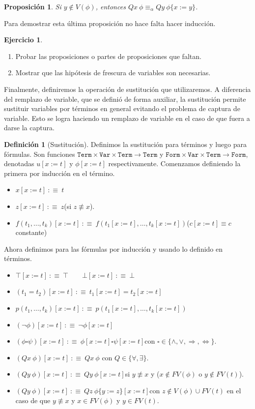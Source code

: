 \documentclass[a4paper, 12pt]{report}
\newcommand{\Ra}{\Rightarrow}
\newcommand{\Lra}{\Leftrightarrow}
\newtheorem{prop}[teorema]{Proposición}
\theoremstyle{definition}
\newtheorem{definicion}[teorema]{Definición}
\newtheorem{ejercicio}{Ejercicio}[section]
\begin{document}
\begin{prop}\label{prop-alphaEquivCV}
	Si $y\not\in V(\phi)$, entonces $Qx~\phi\equiv_\alpha Qy~\phi\{x:=y\}$.
\end{prop}
Para demostrar esta última proposición no hace falta hacer inducción.

\begin{ejercicio}
	\begin{enumerate}
		\item Probar las proposiciones o partes de proposiciones que faltan.
		\item Mostrar que las hipótesis de frescura de variables son necesarias.
	\end{enumerate}
	
\end{ejercicio}

Finalmente, definiremos la operación de sustitución que utilizaremos. A diferencia del remplazo de variable, que se definió de forma auxiliar, la sustitución permite sustituir variables por términos en general evitando el problema de captura de variable. Esto se logra haciendo un remplazo de variable en el caso de que fuera a darse la captura.

\begin{definicion}[Sustitución]
	Definimos la sustitución para términos y luego para fórmulas. Son funciones $\mathtt{Term}\times\mathtt{Var}\times\mathtt{Term}\to\mathtt{Term}$ y $\mathtt{Form}\times\mathtt{Var}\times\mathtt{Term}\to\mathtt{Form}$, denotadas $u[x:=t]$ y $\phi[x:=t]$ respectivamente. Comenzamos definiendo la primera por inducción en el término.
	\begin{itemize}
		\item $x[x:=t] ~:\equiv~ t$
		\item $z[x:=t] ~:\equiv~ z$\quad(si $z\not\equiv x$).
		\item $f(t_1,\dots,t_k)[x:=t]~:\equiv~f(t_1[x:=t],\dots,t_k[x:=t])$\quad ($c[x:=t]\equiv c$ constante)
	\end{itemize}
	Ahora definimos para las fórmulas por inducción y usando lo definido en términos.
	\begin{itemize}
		\item $\top[x:=t]~:\equiv~\top\qquad \bot[x:=t]~:\equiv~\bot$
		\item $(t_1=t_2)[x:=t]~:\equiv~ t_1[x:=t]=t_2[x:=t]$
		\item $p(t_1,\dots,t_k)[x:=t]~:\equiv~p(t_1[x:=t],\dots,t_k[x:=t])$
		\item $(\lnot\phi)[x:=t]~:\equiv~\lnot\phi[x:=t]$
		\item $(\phi\square\psi)[x:=t]~:\equiv~\phi[x:=t]\square\psi[x:=t]$\quad con $\square\in\{\wedge,\vee,\Ra,\Lra\}$.
		\item $(Qx~\phi)[x:=t]~:\equiv~Qx~\phi$ \quad con $Q\in\{\forall,\exists\}$.
		\item $(Qy~\phi)[x:=t]~:\equiv~Qy~\phi[x:=t]$\quad si $y\not\equiv x$ y ($x\not\in FV(\phi)$ o $y\not\in FV(t)$).
		\item $(Qy~\phi)[x:=t]~:\equiv~Qz~\phi\{y:=z\}[x:=t]$\quad con $z\not\in V(\phi)\cup FV(t)$ \quad en el caso de que $y\not\equiv x$ y $x\in FV(\phi)$ y $y\in FV(t)$.
	\end{itemize}
\end{definicion}
\end{document}
